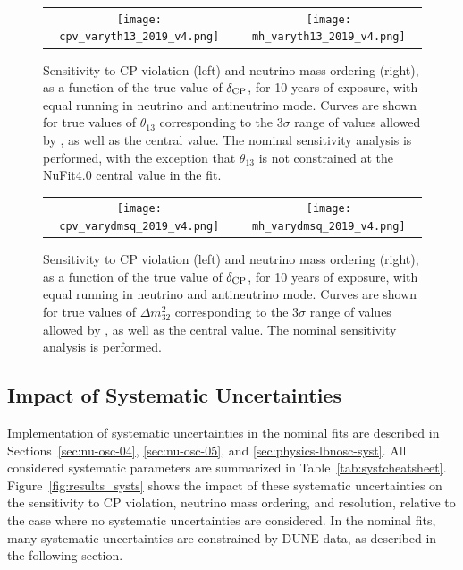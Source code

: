 \begin{figure}[h!]
    \centering
    \begin{tabular}{cc}
		\texttt{[image: cpv\_varyth13\_2019\_v4.png]} &
		\texttt{[image: mh\_varyth13\_2019\_v4.png]}
	\end{tabular}
	\caption[Sensitivity to CP violation and neutrino mass ordering, as a function of $\deltacp$]{Sensitivity to CP violation (left) and neutrino mass ordering (right), as a function of the true value of $\deltacp$, for 10 years of exposure, with equal running in neutrino and antineutrino mode. Curves are shown for true values of $\theta_{13}$ corresponding to the 3$\sigma$ range of values allowed by , as well as the  central value. The nominal sensitivity analysis is performed, with the exception that $\theta_{13}$ is not constrained at the NuFit4.0 central value in the fit.}
    \label{fig:th13var}
\end{figure}

\begin{figure}[h!]
    \centering
    \begin{tabular}{cc}
		\texttt{[image: cpv\_varydmsq\_2019\_v4.png]} &
		\texttt{[image: mh\_varydmsq\_2019\_v4.png]}
	\end{tabular}
	\caption[Sensitivity to CP violation and neutrino mass ordering, as a function of $\deltacp$]{Sensitivity to CP violation (left) and neutrino mass ordering (right), as a function of the true value of $\deltacp$, for 10 years of exposure, with equal running in neutrino and antineutrino mode. Curves are shown for true values of $\Delta m^2_{32}$ corresponding to the 3$\sigma$ range of values allowed by , as well as the  central value. The nominal sensitivity analysis is performed.}
    \label{fig:dmsqvar}
\end{figure}

\subsection{Impact of Systematic Uncertainties}
\label{sec:physics-lbnosc-systresults}

Implementation of systematic uncertainties in the nominal fits are described in Sections~\ref{sec:nu-osc-04}, \ref{sec:nu-osc-05}, and \ref{sec:physics-lbnosc-syst}. All considered systematic parameters are summarized in Table~\ref{tab:systcheatsheet}. Figure~\ref{fig:results_systs} shows the impact of these systematic uncertainties on the sensitivity to CP violation, neutrino mass ordering, and \deltacp resolution, relative to the case where no systematic uncertainties are considered. In the nominal fits, many systematic uncertainties are constrained by DUNE data, as described in the following section.

